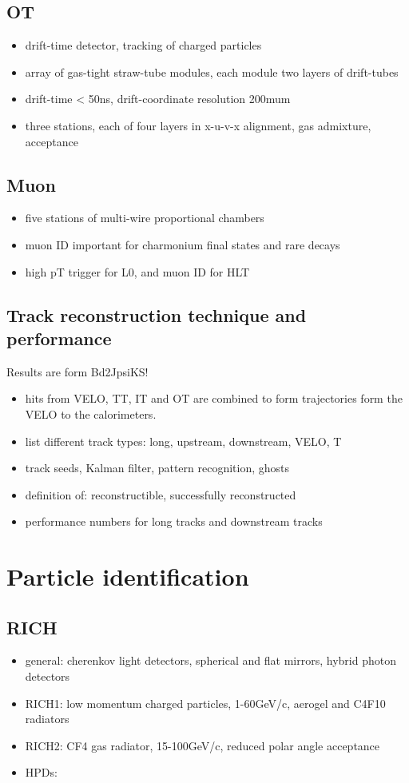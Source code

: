 \subsection{OT}
\begin{itemize}
  \item drift-time detector, tracking of charged particles
  \item array of gas-tight straw-tube modules, each module two layers of drift-tubes
  \item drift-time < 50ns, drift-coordinate resolution 200mum
  \item three stations, each of four layers in x-u-v-x alignment, gas admixture, acceptance
\end{itemize}
\subsection{Muon}
\begin{itemize}
  \item five stations of multi-wire proportional chambers
  \item muon ID important for charmonium final states and rare decays
  \item high pT trigger for L0, and muon ID for HLT
\end{itemize}
\subsection{Track reconstruction technique and performance}
Results are form Bd2JpsiKS!
\begin{itemize}
  \item hits from VELO, TT, IT and OT are combined to form trajectories form the VELO to the calorimeters. 
  \item list different track types: long, upstream, downstream, VELO, T
  \item track seeds, Kalman filter, pattern recognition, ghosts
  \item definition of: reconstructible, successfully reconstructed
  \item performance numbers for long tracks and downstream tracks
\end{itemize}

\section{Particle identification}
\subsection{RICH}
\begin{itemize}
  \item general: cherenkov light detectors, spherical and flat mirrors, hybrid photon detectors
  \item RICH1: low momentum charged particles, 1-60GeV/c, aerogel and C4F10 radiators
  \item RICH2: CF4 gas radiator, 15-100GeV/c, reduced polar angle acceptance
  \item HPDs: 
\end{itemize}
